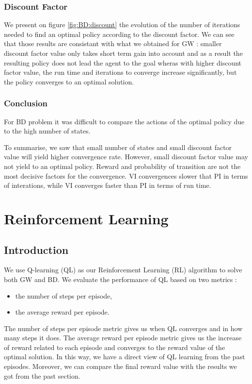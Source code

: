 \documentclass[10pt, twocolumn]{article}
\begin{document}
			\subsubsection*{Discount Factor}
				We present on figure \ref{fig:BD:discount} the evolution of the number of iterations needed to find an optimal policy according to the discount factor. We can see that those results are consistant with what we obtained for GW : smaller discount factor value only takes short term gain into account and as a result the resulting policy does not lead the agent to the goal wheras with higher discount factor value, the run time and iterations to converge increase significantly, but the policy converges to an optimal solution.
			\subsubsection*{Conclusion}
				For BD problem it was difficult to compare the actions of the optimal policy due to the high number of states.

				To summarise, we saw that small number of states and small discount factor value will yield higher convergence rate. However, small discount factor value may not yield to an optimal policy. Reward and probability of transition are not the most decisive factors for the convergence. VI convergences slower that PI in terms of interations, while VI converges faster than PI in terms of run time.
	\section{Reinforcement Learning}
		\subsection*{Introduction}
			We use Q-learning (QL) as our Reinforcement Learning (RL) algorithm to solve both GW and BD. We evaluate the performance of QL based on two metrics :
			\begin{itemize}
				\item the number of steps per episode,
				\item the average reward per episode.
			\end{itemize}
			The number of steps per episode metric gives us when QL converges and in how many steps it does. The average reward per episode metric gives us the increase of reward related to each episode and converges to the reward value of the optimal solution. In this way, we have a direct view of QL learning from the past episodes. Moreover, we can compare the final reward value with the results we got from the past section.
\end{document}
